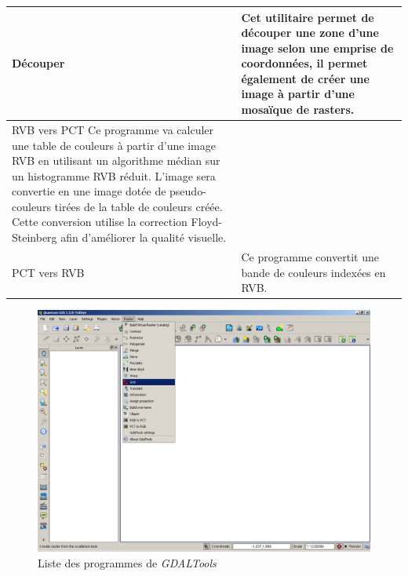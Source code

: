 {\begin{longtable}{|p{3cm}|p{13cm}|}
\hline Découper & Cet utilitaire permet de découper une zone d'une image selon une emprise de coordonnées, il permet également de créer une image à partir d'une mosaïque de rasters. \\
\hline RVB vers PCT Ce programme va calculer une table de couleurs à partir d'une image RVB en utilisant un algorithme médian sur un histogramme RVB réduit. L'image sera convertie en une image dotée de pseudo-couleurs tirées de la table de couleurs créée. Cette conversion utilise la correction Floyd-Steinberg afin d'améliorer la qualité visuelle. \\
PCT vers RVB & Ce programme convertit une bande de couleurs indexées en RVB.\\
\end{longtable}

\begin{figure}[ht]
   \centering
   \caption{\label{gdaltools_menu}Liste des programmes de \emph{GDALTools} \nixcaption}
   \includegraphics[clip=true, width=12cm]{plugins_gdaltools_images/raster_menu}
\end{figure}

}
